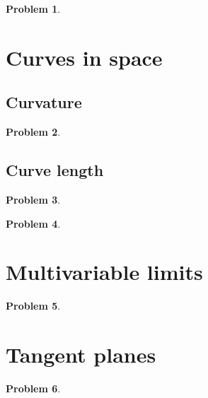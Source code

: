\documentclass{article}
\newtheorem{problem}{Problem}
\begin{document}
\begin{problem}

\end{problem}


\section{Curves in space}
\subsection{Curvature}
\begin{problem}

\end{problem}


\subsection{Curve length}
\begin{problem}

\end{problem}

\begin{problem}

\end{problem}


\section{Multivariable limits}


\begin{problem}

\end{problem}


\section{Tangent planes}


\begin{problem}

\end{problem}
\end{document}
